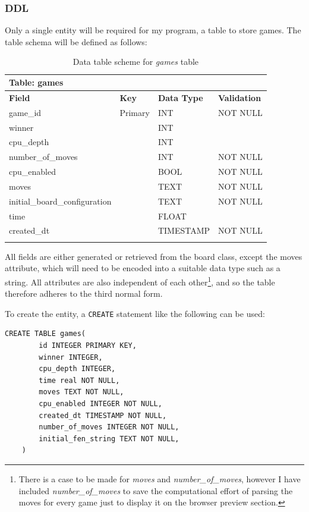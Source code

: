 \documentclass[../main/main.tex]{subfiles}
\begin{document}
\subsubsection*{DDL}
\label{sec:design-ddl}
Only a single entity will be required for my program, a table to store games. The table schema will be defined as follows:

\begin{longtable}[c]{l|l|l|l}
    \multicolumn{4}{l}{\textbf{Table: games}}\\
    \toprule
    \textbf{Field} & \textbf{Key} & \textbf{Data Type} & \textbf{Validation}\\
    \midrule
    \endfirsthead
    \endhead

    game\_id & Primary & INT & NOT NULL\\
    winner &  & INT & \\
    cpu\_depth &  & INT & \\
    number\_of\_moves &  & INT & NOT NULL\\
    cpu\_enabled &  & BOOL & NOT NULL\\
    moves &  & TEXT & NOT NULL\\
    initial\_board\_configuration &  & TEXT & NOT NULL\\
    time &  & FLOAT & \\
    created\_dt &  & TIMESTAMP & NOT NULL\\

    \bottomrule

\caption{Data table scheme for \textit{games} table}
\label{tab:games-schema}
\end{longtable}

All fields are either generated or retrieved from the board class, except the moves attribute, which will need to be encoded into a suitable data type such as a string. All attributes are also independent of each other\footnote{There is a case to be made for \textit{moves} and \textit{number\_of\_moves}, however I have included \textit{number\_of\_moves} to save the computational effort of parsing the moves for every game just to display it on the browser preview section.}, and so the table therefore adheres to the third normal form.

To create the entity, a \lstinline[language=sqlite]{CREATE} statement like the following can be used:

\begin{lstlisting}[language=sqlite, frame=lines]
    CREATE TABLE games(
        id INTEGER PRIMARY KEY,
        winner INTEGER,
        cpu_depth INTEGER,
        time real NOT NULL,
        moves TEXT NOT NULL,
        cpu_enabled INTEGER NOT NULL,
        created_dt TIMESTAMP NOT NULL,
        number_of_moves INTEGER NOT NULL,
        initial_fen_string TEXT NOT NULL,
    )
\end{lstlisting}
\end{document}
